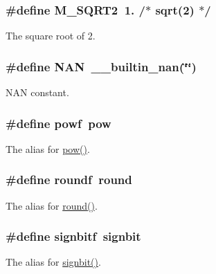 \subsubsection[{\texorpdfstring{M\+\_\+\+S\+Q\+R\+T2}{M_SQRT2}}]{\setlength{\rightskip}{0pt plus 5cm}\#define M\+\_\+\+S\+Q\+R\+T2~1.	/$\ast$ {\bf sqrt}(2) $\ast$/}\hypertarget{group__avr__math_ga66b3ab30f1332874326ed93969e496e0}{}\label{group__avr__math_ga66b3ab30f1332874326ed93969e496e0}
The square root of 2. 
\subsubsection[{\texorpdfstring{N\+AN}{NAN}}]{\setlength{\rightskip}{0pt plus 5cm}\#define N\+AN~\+\_\+\+\_\+builtin\+\_\+nan(\char`\"{}\char`\"{})}\hypertarget{group__avr__math_ga8abfcc76130f3f991d124dd22d7e69bc}{}\label{group__avr__math_ga8abfcc76130f3f991d124dd22d7e69bc}
N\+AN constant. 
\subsubsection[{\texorpdfstring{powf}{powf}}]{\setlength{\rightskip}{0pt plus 5cm}\#define powf~{\bf pow}}\hypertarget{group__avr__math_gaa5a93b1934ef470b7a44ae47e6f2798b}{}\label{group__avr__math_gaa5a93b1934ef470b7a44ae47e6f2798b}
The alias for \hyperlink{group__avr__math_gaa9a9885e972736204c941a7e9db0ffe2}{pow()}. 
\subsubsection[{\texorpdfstring{roundf}{roundf}}]{\setlength{\rightskip}{0pt plus 5cm}\#define roundf~{\bf round}}\hypertarget{group__avr__math_gac6950642117c821388ec37e7b656a346}{}\label{group__avr__math_gac6950642117c821388ec37e7b656a346}
The alias for \hyperlink{group__avr__math_ga79dbf1906373fcc3bf5edf1ec91674cc}{round()}. 
\subsubsection[{\texorpdfstring{signbitf}{signbitf}}]{\setlength{\rightskip}{0pt plus 5cm}\#define signbitf~{\bf signbit}}\hypertarget{group__avr__math_gacff7dd1db8fe93d3e52d5bd161d8117d}{}\label{group__avr__math_gacff7dd1db8fe93d3e52d5bd161d8117d}
The alias for \hyperlink{group__avr__math_ga630a57ee687f001f8e5a218c9b79f50b}{signbit()}. 

